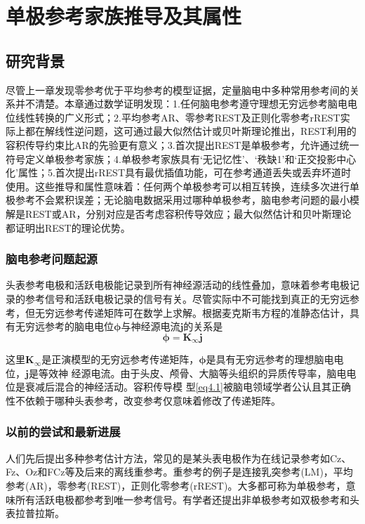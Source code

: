 \chapter{单极参考家族推导及其属性}
\section{研究背景}
尽管上一章发现零参考优于平均参考的模型证据，定量脑电中多种常用参考间的关系并不清楚。本章通过数学证明发现：1.任何脑电参考遵守理想无穷远参考脑电电位线性转换的广义形式；2.平均参考AR、零参考REST及正则化零参考rREST实际上都在解线性逆问题，这可通过最大似然估计或贝叶斯理论推出，REST利用的容积传导约束比AR的先验更有意义；3.首次提出REST是单极参考，允许通过统一符号定义单极参考家族；4.单极参考家族具有‘无记忆性’、‘秩缺1’和‘正交投影中心化’属性；5.首次提出rREST具有最优插值功能，可在参考通道丢失或丢弃坏道时使用。这些推导和属性意味着：任何两个单极参考可以相互转换，连续多次进行单极参考不会累积误差；无论脑电数据采用过哪种单极参考，脑电参考问题的最小模解是REST或AR，分别对应是否考虑容积传导效应；最大似然估计和贝叶斯理论都证明出REST的理论优势。

\subsection{脑电参考问题起源}
头表参考电极和活跃电极能记录到所有神经源活动的线性叠加，意味着参考电极记录的参考信号和活跃电极记录的信号有关。尽管实际中不可能找到真正的无穷远参考，但无穷远参考传递矩阵可在数学上求解。根据麦克斯韦方程的准静态估计，具有无穷远参考的脑电电位$\mathbf{\phi}$与神经源电流$\mathbf{j}$的关系是
\begin{equation}\label{eq4.1}
\mathbf{\phi}=\mathbf{K}_{\infty}\mathbf{j}
\end{equation}

这里$\mathbf{K}_\infty$是正演模型的无穷远参考传递矩阵，$\mathbf{\phi}$是具有无穷远参考的理想脑电电位，$\mathbf{j}$是等效神
经源电流。由于头皮、颅骨、大脑等头组织的异质传导率，脑电电位是衰减后混合的神经活动。容积传导模
型\eqref{eq4.1}被脑电领域学者公认且其正确性不依赖于哪种头表参考，改变参考仅意味着修改了传递矩阵。

\subsection{以前的尝试和最新进展}
人们先后提出多种参考估计方法，常见的是某头表电极作为在线记录参考如Cz、Fz、Oz和FCz等及后来的离线重参考。重参考的例子是连接乳突参考(LM)，平均参考(AR)，零参考(REST)，正则化零参考(rREST)。大多都可称为单极参考，意味所有活跃电极都参考到唯一参考信号。有学者还提出非单极参考如双极参考和头表拉普拉斯。


